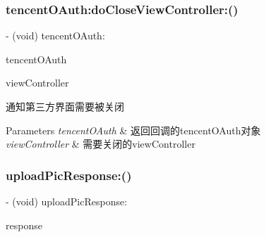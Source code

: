 \subsubsection{\texorpdfstring{tencent\+O\+Auth\+:do\+Close\+View\+Controller\+:()}{tencentOAuth:doCloseViewController:()}\hspace{0.1cm}{\footnotesize\ttfamily [2/2]}}
{\footnotesize\ttfamily -\/ (void) tencent\+O\+Auth\+: \begin{DoxyParamCaption}\item[{(\mbox{\hyperlink{interface_tencent_o_auth}{Tencent\+O\+Auth}} $\ast$)}]{tencent\+O\+Auth }\item[{doCloseViewController:(U\+I\+View\+Controller $\ast$)}]{view\+Controller }\end{DoxyParamCaption}\hspace{0.3cm}{\ttfamily [optional]}}

通知第三方界面需要被关闭 
\begin{DoxyParams}{Parameters}
{\em tencent\+O\+Auth} & 返回回调的tencent\+O\+Auth对象 \\
\hline
{\em view\+Controller} & 需要关闭的view\+Controller \\
\hline
\end{DoxyParams}
\mbox{\label{protocol_tencent_session_delegate-p_ae464b20ef11dd5fbed06862bcbe2f7d2}} 
\subsubsection{\texorpdfstring{upload\+Pic\+Response\+:()}{uploadPicResponse:()}\hspace{0.1cm}{\footnotesize\ttfamily [1/2]}}
{\footnotesize\ttfamily -\/ (void) upload\+Pic\+Response\+: \begin{DoxyParamCaption}\item[{(\mbox{\hyperlink{interface_a_p_i_response}{A\+P\+I\+Response}} $\ast$)}]{response }\end{DoxyParamCaption}\hspace{0.3cm}{\ttfamily [optional]}}

